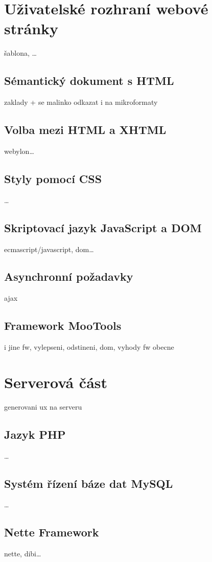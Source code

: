 \section{Uživatelské rozhraní webové stránky}
šablona, \ldots
\subsection{Sémantický dokument s HTML}
zaklady + se malinko odkazat i na mikroformaty

\subsection{Volba mezi HTML a XHTML}
webylon\ldots

\subsection{Styly pomocí CSS}
\ldots

\subsection{Skriptovací jazyk JavaScript a DOM}\label{javaScript}
ecmascript/javascript, dom\ldots

\subsection{Asynchronní požadavky}\label{ajax}
ajax

\subsection{Framework MooTools}
i jine fw, vylepseni, odstineni, dom, vyhody fw obecne

\section{Serverová část}
generovani ux na serveru
\subsection{Jazyk PHP}
\ldots
\subsection{Systém řízení báze dat MySQL}
\ldots
\subsection{Nette Framework}
nette, dibi\ldots

